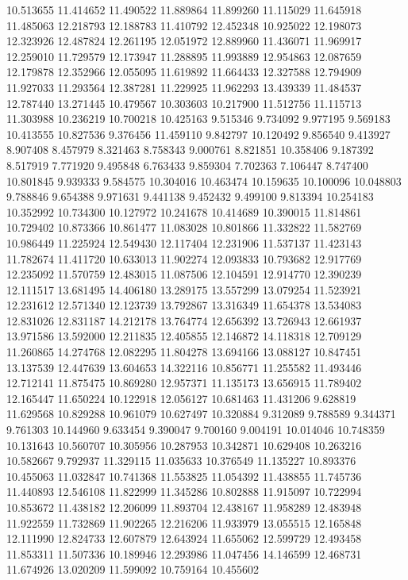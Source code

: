 10.513655
11.414652
11.490522
11.889864
11.899260
11.115029
11.645918
11.485063
12.218793
12.188783
11.410792
12.452348
10.925022
12.198073
12.323926
12.487824
12.261195
12.051972
12.889960
11.436071
11.969917
12.259010
11.729579
12.173947
11.288895
11.993889
12.954863
12.087659
12.179878
12.352966
12.055095
11.619892
11.664433
12.327588
12.794909
11.927033
11.293564
12.387281
11.229925
11.962293
13.439339
11.484537
12.787440
13.271445
10.479567
10.303603
10.217900
11.512756
11.115713
11.303988
10.236219
10.700218
10.425163
9.515346
9.734092
9.977195
9.569183
10.413555
10.827536
9.376456
11.459110
9.842797
10.120492
9.856540
9.413927
8.907408
8.457979
8.321463
8.758343
9.000761
8.821851
10.358406
9.187392
8.517919
7.771920
9.495848
6.763433
9.859304
7.702363
7.106447
8.747400
10.801845
9.939333
9.584575
10.304016
10.463474
10.159635
10.100096
10.048803
9.788846
9.654388
9.971631
9.441138
9.452432
9.499100
9.813394
10.254183
10.352992
10.734300
10.127972
10.241678
10.414689
10.390015
11.814861
10.729402
10.873366
10.861477
11.083028
10.801866
11.332822
11.582769
10.986449
11.225924
12.549430
12.117404
12.231906
11.537137
11.423143
11.782674
11.411720
10.633013
11.902274
12.093833
10.793682
12.917769
12.235092
11.570759
12.483015
11.087506
12.104591
12.914770
12.390239
12.111517
13.681495
14.406180
13.289175
13.557299
13.079254
11.523921
12.231612
12.571340
12.123739
13.792867
13.316349
11.654378
13.534083
12.831026
12.831187
14.212178
13.764774
12.656392
13.726943
12.661937
13.971586
13.592000
12.211835
12.405855
12.146872
14.118318
12.709129
11.260865
14.274768
12.082295
11.804278
13.694166
13.088127
10.847451
13.137539
12.447639
13.604653
14.322116
10.856771
11.255582
11.493446
12.712141
11.875475
10.869280
12.957371
11.135173
13.656915
11.789402
12.165447
11.650224
10.122918
12.056127
10.681463
11.431206
9.628819
11.629568
10.829288
10.961079
10.627497
10.320884
9.312089
9.788589
9.344371
9.761303
10.144960
9.633454
9.390047
9.700160
9.004191
10.014046
10.748359
10.131643
10.560707
10.305956
10.287953
10.342871
10.629408
10.263216
10.582667
9.792937
11.329115
11.035633
10.376549
11.135227
10.893376
10.455063
11.032847
10.741368
11.553825
11.054392
11.438855
11.745736
11.440893
12.546108
11.822999
11.345286
10.802888
11.915097
10.722994
10.853672
11.438182
12.206099
11.893704
12.438167
11.958289
12.483948
11.922559
11.732869
11.902265
12.216206
11.933979
13.055515
12.165848
12.111990
12.824733
12.607879
12.643924
11.655062
12.599729
12.493458
11.853311
11.507336
10.189946
12.293986
11.047456
14.146599
12.468731
11.674926
13.020209
11.599092
10.759164
10.455602
